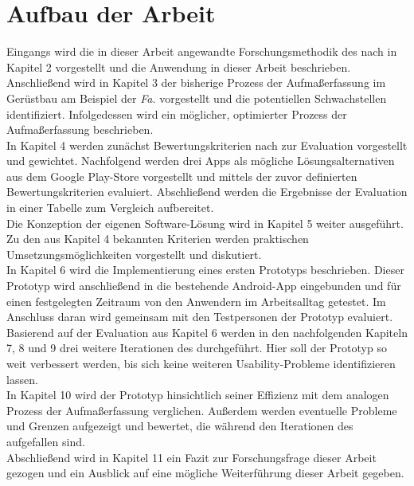 \section{Aufbau der Arbeit}
Eingangs wird die in dieser Arbeit angewandte Forschungsmethodik des \hcdp{} nach \citet{Norman13} in Kapitel 2 vorgestellt und die Anwendung in dieser Arbeit beschrieben. \\

Anschließend wird in Kapitel 3 der bisherige Prozess der Aufmaßerfassung im Gerüstbau am Beispiel der \emph{Fa.} \vr{} vorgestellt und die potentiellen Schwachstellen identifiziert. 
Infolgedessen wird ein möglicher, optimierter Prozess der Aufmaßerfassung beschrieben. \\

In Kapitel 4 werden zunächst Bewertungskriterien nach \citet{Nielsen94} zur Evaluation vorgestellt und gewichtet.
Nachfolgend werden drei Apps als mögliche Lösungsalternativen aus dem Google Play-Store vorgestellt und mittels der zuvor definierten Bewertungskriterien evaluiert.
Abschließend werden die Ergebnisse der Evaluation in einer Tabelle zum Vergleich aufbereitet. \\

Die Konzeption der eigenen Software-Lösung wird in Kapitel 5 weiter ausgeführt.
Zu den aus Kapitel 4 bekannten Kriterien werden praktischen Umsetzungsmöglichkeiten vorgestellt und diskutiert. \\

In Kapitel 6 wird die Implementierung eines ersten Prototyps beschrieben.
Dieser Prototyp wird anschließend in die bestehende Android-App eingebunden und für einen festgelegten Zeitraum von den Anwendern im Arbeitsalltag getestet.
Im Anschluss daran wird gemeinsam mit den Testpersonen der Prototyp evaluiert. \\

Basierend auf der Evaluation aus Kapitel 6 werden in den nachfolgenden Kapiteln 7, 8 und 9 drei weitere Iterationen des \hcdp{} durchgeführt.
Hier soll der Prototyp so weit verbessert werden, bis sich keine weiteren Usability-Probleme identifizieren lassen. \\

In Kapitel 10 wird der Prototyp hinsichtlich seiner Effizienz mit dem analogen Prozess der Aufmaßerfassung verglichen.
Außerdem werden eventuelle Probleme und Grenzen aufgezeigt und bewertet, die während den Iterationen des \hcdp{} aufgefallen sind.\\

Abschließend wird in Kapitel 11 ein Fazit zur Forschungsfrage dieser Arbeit gezogen und ein Ausblick auf eine mögliche Weiterführung dieser Arbeit gegeben.
